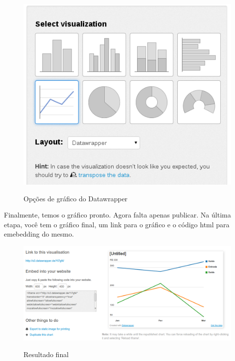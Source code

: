\documentclass[12pt,onecolumn]{article}
\begin{document}
    \begin{figure}[H]
      \begin{center}
        \includegraphics[scale=0.4]{datawrapper-charts.png}
        \label{fig:datawrapper-charts}
        \caption{Opções de gráfico do Datawrapper}
      \end{center}
    \end{figure}
    
    Finalmente, temos o gráfico pronto. Agora falta apenas publicar. Na última etapa,
    você tem o gráfico final, um link para o gráfico e o código html para emebedding
    do mesmo.
    
    \begin{figure}[H]
      \begin{center}
        \includegraphics[width=.9\linewidth]{datawrapper-final.png}
        \label{fig:datawrapper-final}
        \caption{Resultado final}
      \end{center}
    \end{figure}
    
\end{document}
